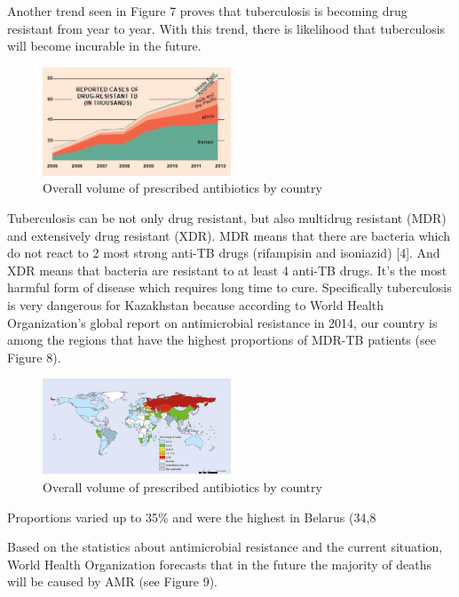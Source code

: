Another trend seen in Figure 7 proves that tuberculosis is becoming drug resistant from year to year. With this trend, there is likelihood that tuberculosis will become incurable in the future.

\begin{figure}[H]
  \centering
  \includegraphics[width=0.5\textwidth]{img/Fig7}
  \caption{Overall volume of prescribed antibiotics by country}
  \label{fig7}
\end{figure}

Tuberculosis can be not only drug resistant, but also multidrug resistant (MDR) and extensively drug resistant (XDR). MDR means that there are bacteria which do not react to 2 most strong anti-TB drugs (rifampisin and isoniazid) [4]. And XDR means that bacteria are resistant to at least 4 anti-TB drugs. It’s the most harmful form of disease which requires long time to cure. Specifically tuberculosis is very dangerous for Kazakhstan because according to World Health Organization’s global report on antimicrobial resistance in 2014, our country is among the regions that have the highest proportions of MDR-TB patients (see Figure 8).

\begin{figure}[H]
  \centering
  \includegraphics[width=0.5\textwidth]{img/Fig8}
  \caption{Overall volume of prescribed antibiotics by country}
  \label{fig8}
\end{figure}

Proportions varied up to 35\% and were the highest in Belarus (34,8%

Based on the statistics about antimicrobial resistance and the current situation, World Health Organization forecasts that in the future the majority of deaths will be caused by AMR (see Figure 9).

